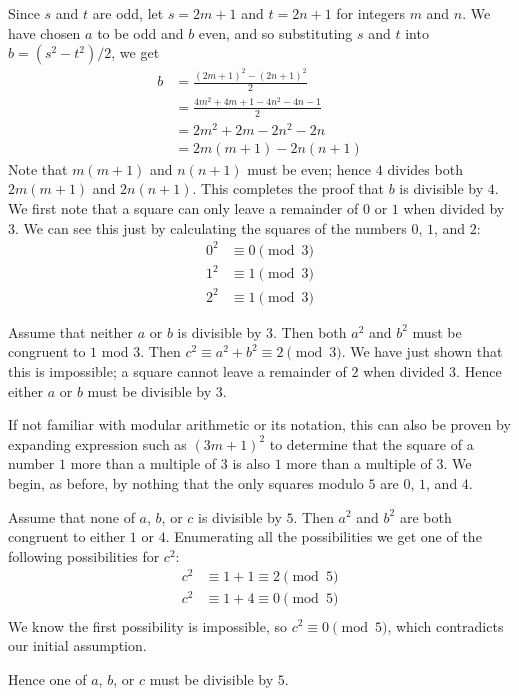 \sol
Since \(s\) and \(t\) are odd,
let \(s=2m+1\) and \(t=2n+1\)
for integers \(m\) and \(n\).
We have chosen \(a\) to be odd
and \(b\) even, and so substituting
\(s\) and \(t\) into \(b=(s^2-t^2)/2\),
we get
\[
\begin{split}
b&=\frac{(2m+1)^2-(2n+1)^2}{2}\\
&=\frac{4m^2+4m+1-4n^2-4n-1}{2}\\
&=2m^2+2m-2n^2-2n\\
&=2m(m+1)-2n(n+1)
\end{split}
\]
Note that \(m(m+1)\) and \(n(n+1)\)
must be even; hence \(4\) divides both \(2m(m+1)\)
and \(2n(n+1)\).
This completes the proof that \(b\) is
divisible by \(4\).
\sol
We first note that a square can only
leave a remainder of \(0\) or \(1\)
when divided by \(3\). We can see this
just by calculating the squares of the
numbers \(0\), \(1\), and \(2\):
\[
\begin{split}
0^2&\equiv0\pmod{3}\\
1^2&\equiv1\pmod{3}\\
2^2&\equiv1\pmod{3}
\end{split}
\]

Assume that neither \(a\) or \(b\)
is divisible by \(3\). Then both
\(a^2\) and \(b^2\) must be congruent to
\(1\) mod \(3\). Then \(c^2\equiv a^2+b^2
\equiv2\pmod{3}\). We have just shown
that this is impossible; a square cannot
leave a remainder of \(2\) when divided \(3\).
Hence either \(a\) or \(b\) must be divisible
by \(3\).

If not familiar with modular arithmetic or
its notation, this can also be proven by
expanding expression such as \((3m+1)^2\) to
determine that the square of a number \(1\) more than
a multiple of \(3\) is also \(1\) more than
a multiple of \(3\).
\sol
We begin, as before, by nothing that
the only squares modulo \(5\) are \(0\), \(1\),
and \(4\).

Assume that none of \(a\), \(b\), or \(c\)
is divisible by \(5\).
Then \(a^2\) and \(b^2\) are both congruent
to either \(1\) or \(4\).
Enumerating all the possibilities we get
one of the following possibilities for \(c^2\):
\[
\begin{split}
c^2&\equiv1+1\equiv2\pmod{5}\\
c^2&\equiv1+4\equiv0\pmod{5}\\
\end{split}
\]
We know the first possibility is impossible,
so \(c^2\equiv0\pmod{5}\), which contradicts
our initial assumption.

Hence one of \(a\), \(b\), or \(c\)
must be divisible by \(5\).

